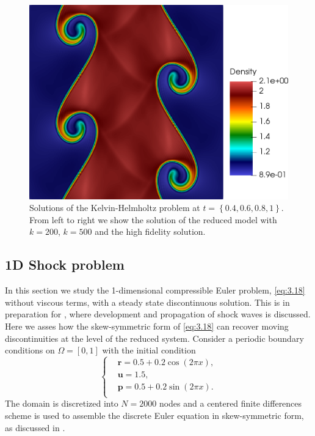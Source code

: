 \begin{figure}[h!]
\includegraphics[scale=0.115]{data/Compressible_Euler/KH/Snapshots/density_exact_768.png}

\caption{Solutions of the Kelvin-Helmholtz problem at $t=\left\{ 0.4, 0.6, 0.8, 1 \right\}$. From left to right we show the solution of the reduced model with $k=200$, $k=500$ and the high fidelity solution.}
\label{fig:snap_solution_KH}
\end{figure}


\subsection{1D Shock problem}
In this section we study the 1-dimensional compressible Euler problem, \eqref{eq:3.18} without viscous terms, with a steady state discontinuous solution. This is in preparation for , where development and propagation of shock waves is discussed. Here we asses how the skew-symmetric form of \eqref{eq:3.18} can recover moving discontinuities at the level of the reduced system. Consider a periodic boundary conditions on $\Omega = [0,1]$ with the initial condition
\begin{equation*}
\begin{cases}
& \mathbf{r} = 0.5+0.2 \cos(2\pi x),\\
& \mathbf{u} = 1.5,\\
& \mathbf{p} = 0.5+0.2 \sin(2\pi x).\\
\end{cases}
\end{equation*}
The domain is discretized into $N=2000$ nodes and a centered finite differences scheme is used to assemble the discrete Euler equation in skew-symmetric form, as discussed in . 


